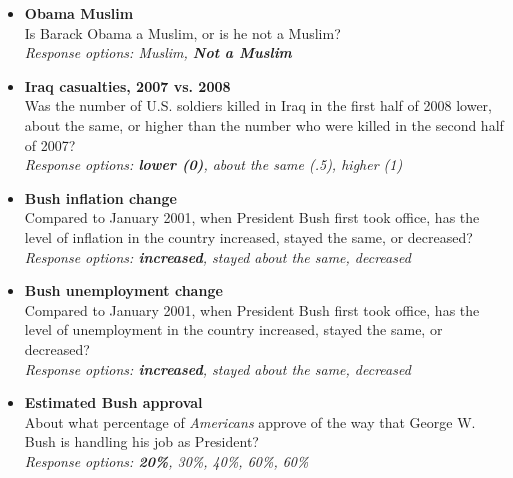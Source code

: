 \documentclass[12pt, letterpaper]{article}
\begin{document}
\normalsize
\begin{itemize}
\item \textbf{Obama Muslim} \\
Is Barack Obama a Muslim, or is he not a Muslim?  \\     
\textit{Response options: Muslim, \textbf{Not a Muslim}} \\
\end{itemize}





\large {}

\vspace{.2in}


\normalsize 
   \begin{itemize}
       \item \textbf{Iraq casualties, 2007 vs. 2008} \\
       Was the number of U.S. soldiers killed in Iraq in the first half of 2008 lower, about the same, or higher than the number who were killed in the second half of 2007?
       \\\textit{Response options: \textbf{lower (0)}, about the same (.5), higher (1)}
   \end{itemize}
   
      \begin{itemize}
       \item \textbf{Bush inflation change} \\
       Compared to January 2001, when President Bush first took office, has the level of inflation in the country increased, stayed the same, or decreased?
 \\\textit{Response options: \textbf{increased}, stayed about the same, decreased}
   \end{itemize}

     \begin{itemize}
       \item \textbf{Bush unemployment change} \\
       Compared to January 2001, when President Bush first took office, has the level of unemployment in the country increased, stayed the same, or decreased?
 \\\textit{Response options: \textbf{increased}, stayed about the same, decreased}
   \end{itemize}
   
        \begin{itemize}
       \item \textbf{Estimated Bush approval} \\
       About what percentage of \textit{Americans} approve of the way that George W. Bush is handling his job as President?
\\ \textit{Response options: \textbf{20\%}, 30\%, 40\%, 60\%, 60\%}
   \end{itemize}
   
\end{document}
